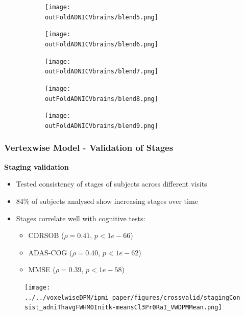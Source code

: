 \documentclass[10pt,xcolor=table]{beamer}
\begin{document}
\begin{frame}
\begin{figure}[h]
    \begin{subfigure}[b]{\scaleFig\textwidth}\texttt{[image: \\outFoldADNICVbrains/blend5.png]}\end{subfigure}
    \begin{subfigure}[b]{\scaleFig\textwidth}\texttt{[image: \\outFoldADNICVbrains/blend6.png]}\end{subfigure}
    \begin{subfigure}[b]{\scaleFig\textwidth}\texttt{[image: \\outFoldADNICVbrains/blend7.png]}\end{subfigure}
    \begin{subfigure}[b]{\scaleFig\textwidth}\texttt{[image: \\outFoldADNICVbrains/blend8.png]}\end{subfigure}
    \begin{subfigure}[b]{\scaleFig\textwidth}\texttt{[image: \\outFoldADNICVbrains/blend9.png]}\end{subfigure}
    
    \label{fig:ADNICVbrains}
\end{figure}

\end{frame}

\begin{frame}
\frametitle{Vertexwise Model - Validation of Stages}

\textbf{Staging validation}
\begin{itemize}
 \item Tested consistency of stages of subjects across different visits
 \item 84\% of subjects analysed show increasing stages over time
 \item Stages correlate well with cognitive tests:
 \begin{itemize}
  \item CDRSOB ($\rho = 0.41$, $p < 1e-66$)
  \item ADAS-COG ($\rho = 0.40$, $p < 1e-62$)
  \item MMSE ($\rho = 0.39$, $p < 1e-58$) 
 \end{itemize}
\end{itemize}

\vspace{-1em}

\begin{figure}[h]
    \centering
    \texttt{[image: ../../voxelwiseDPM/ipmi\_paper/figures/crossvalid/stagingConsist\_adniThavgFWHM0Initk-meansCl3Pr0Ra1\_VWDPMMean.png]}
\end{figure}

\vspace{-2em}

\end{frame}
\end{document}
